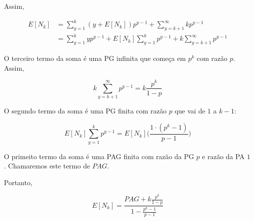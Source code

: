 \documentclass[a4paper]{article}
\begin{document}
  Assim, 
  
  \begin{equation*}
      \begin{split}
          E[N_k] &= \sum_{y = 1}^k(y + E[N_k])p^{y-1} + \sum_{y = k+1}^\infty kp^{y-1} \\
            &= \sum_{y = 1}^kyp^{y-1} + E[N_k]\sum_{y = 1}^kp^{y-1} + k\sum_{y = k+1}^\infty p^{y-1}
      \end{split}
  \end{equation*}

O terceiro termo da soma é uma PG infinita que começa em $p^k$ com razão $p$. Assim, 

$$k\sum_{y = k+1}^\infty p^{y-1} = k\frac{p^k}{1-p}$$

O segundo termo da soma é uma PG finita com razão $p$ que vai de $1$ a $k-1$:

$$E[N_k]\sum_{y = 1}^kp^{y-1} = E[N_k] \Big( \frac{1 \cdot (p^k-1)}{p-1}\Big)$$

O primeito termo da soma é uma PAG finita com razão da PG $p$ e razão da PA $1$. Chamaremos este termo de $PAG$.

Portanto, 

$$E[N_k] = \frac{PAG+k\frac{p^k}{1-p}}{1-\frac{p^k-1}{p-1}}$$








%
\end{document}
